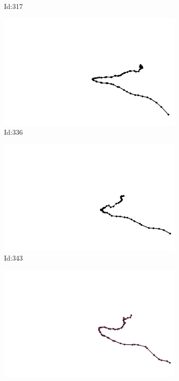 \documentclass[12pt,twoside]{report}
\begin{document}
\begin{figure}
\begin{subfigure}[b]{0.20\textwidth}
\caption{Id:317}
\end{subfigure}
\begin{subfigure}[b]{0.20\textwidth}
\centering
\includegraphics[width=\textwidth]{../trajectories/336.png}
\caption{Id:336}
\end{subfigure}
\begin{subfigure}[b]{0.20\textwidth}
\centering
\includegraphics[width=\textwidth]{../trajectories/343.png}
\caption{Id:343}
\end{subfigure}
\begin{subfigure}[b]{0.20\textwidth}
\centering
\includegraphics[width=\textwidth]{../trajectories/372.png}

\end{subfigure}
\end{figure}
\end{document}
